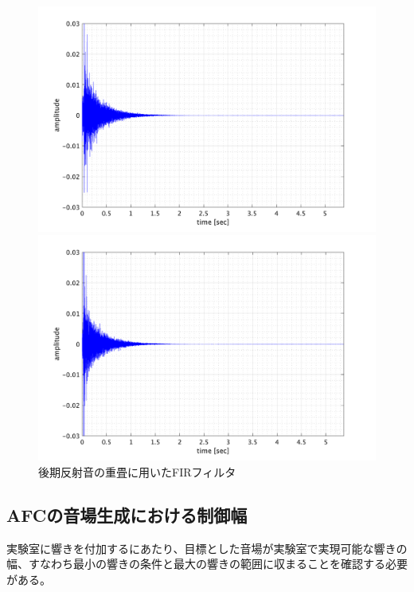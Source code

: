 \documentclass[11pt,a4j]{jreport}
\begin{document}
\begin{figure}[H]
  \begin{minipage}[b]{.5\linewidth}
    \centering
    \includegraphics[width=.8\linewidth]{images/convolutedIr/REV3.png}
  \end{minipage}%
  \begin{minipage}[b]{.5\linewidth}
    \centering
    \includegraphics[width=.8\linewidth]{images/convolutedIr/REV4.png}
  \end{minipage}

  \centering
  \caption{後期反射音の重畳に用いたFIRフィルタ}
  \label{fig:後期反射音の重畳に用いたフィルタ}
\end{figure}

\newpage
\subsection*{AFCの音場生成における制御幅}
実験室に響きを付加するにあたり、目標とした音場が実験室で実現可能な響きの幅、すなわち最小の響きの条件と最大の響きの範囲に収まることを確認する必要がある。
\end{document}
